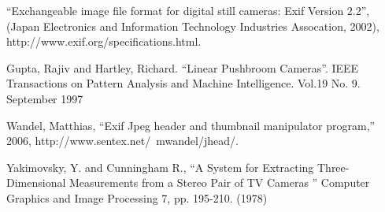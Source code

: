 \begin{thebibliography}{1}

 ``Exchangeable image file format for digital still cameras: Exif Version 2.2'',
(Japan Electronics and Information Technology Industries Assocation, 2002),
http://www.exif.org/specifications.html.

 Gupta, Rajiv and Hartley, Richard. ``Linear Pushbroom Cameras''.  IEEE
 Transactions on Pattern Analysis and Machine Intelligence. Vol.19 No. 9. September 1997

 Wandel, Matthias, ``Exif Jpeg header and thumbnail manipulator program,'' 2006,
http://www.sentex.net/~mwandel/jhead/.

  Yakimovsky, Y. and Cunningham R., ``A System for Extracting
  Three-Dimensional Measurements from a Stereo Pair of TV Cameras ''
  Computer Graphics and Image Processing 7, pp. 195-210. (1978)

\end{thebibliography}
